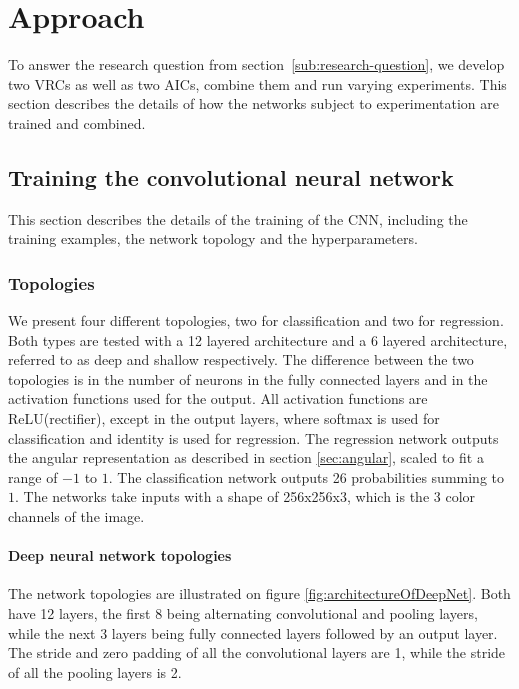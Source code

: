 
\section{Approach}
\label{sec:approach}
To answer the research question from section~\ref{sub:research-question}, we develop two VRCs as well as two AICs, combine them and run varying experiments. This section describes the details of how the networks subject to experimentation are trained and combined.

\subsection{Training the convolutional neural network}
This section describes the details of the training of the CNN, including the training examples, the network topology and the hyperparameters. 

\subsubsection{Topologies}
\label{sec:approachtopologies}
We present four different topologies, two for classification and two for regression. Both types are tested with a 12 layered architecture and a 6 layered architecture, referred to as deep and shallow respectively. The difference between the two topologies is in the number of neurons in the fully connected layers and in the activation functions used for the output. All activation functions are ReLU(rectifier), except in the output layers, where softmax is used for classification and identity is used for regression. The regression network outputs the angular representation as described in section \ref{sec:angular}, scaled to fit a range of $-1$ to $1$. The classification network outputs 26 probabilities summing to $1$. The networks take inputs with a shape of 256x256x3, which is the 3 color channels of the image.

\paragraph{Deep neural network topologies}
The network topologies are illustrated on figure \ref{fig:architectureOfDeepNet}. Both have 12 layers, the first 8 being alternating convolutional and pooling layers, while the next 3 layers being fully connected layers followed by an output layer.  The stride and zero padding of all the convolutional layers are 1, while the stride of all the pooling layers is 2.

